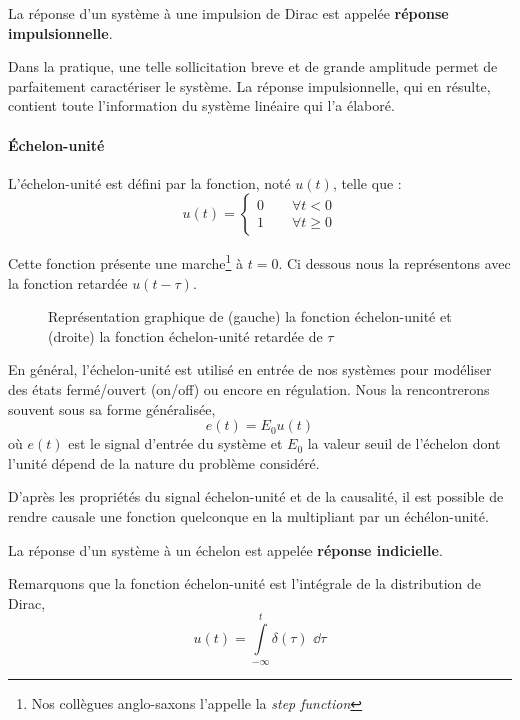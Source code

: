 La réponse d'un système à une impulsion de Dirac est appelée \textbf{réponse impulsionnelle}.

Dans la pratique, une telle sollicitation breve et de grande amplitude
permet de parfaitement caractériser le système. La réponse impulsionnelle, qui en résulte, contient
toute l'information du système linéaire qui l'a élaboré.

\paragraph{\'Echelon-unité}

L'échelon-unité est défini par la fonction, noté $u(t)$, telle que :
$$
u(t)=
\begin{cases} 
0 \qquad \forall t<0    \\ 
1 \qquad \forall t\geq 0 
\end{cases}
$$

Cette fonction présente une marche\footnote{Nos 
collègues anglo-saxons l'appelle la \og\emph{step function}\fg} à $t=0$. 
Ci dessous nous la représentons avec la fonction retardée $u(t-\tau)$.
\begin{figure}[!h]
\begin{center}

\end{center}
    \caption{Représentation graphique de (gauche) la fonction échelon-unité et (droite) la fonction 
    échelon-unité retardée de $\tau$\label{fig-echelon}}
\end{figure}

En général, l'échelon-unité est utilisé en entrée de nos systèmes pour 
modéliser des états fermé/ouvert (\og on/off\fg) ou encore en régulation.
Nous la rencontrerons souvent sous sa forme généralisée, 
$$
e(t)=E_0u(t)
$$
où $e(t)$ est le signal d'entrée du système et $E_0$ la valeur seuil de l'échelon dont 
l'unité dépend de la nature du problème considéré.

D'après les propriétés du signal échelon-unité et de la causalité, il est possible 
de rendre causale une fonction quelconque en la multipliant par un échélon-unité.

La réponse d'un système à un échelon est appelée \textbf{réponse indicielle}.

Remarquons que la fonction échelon-unité est l'intégrale de la distribution de Dirac,
$$
u(t)=\int\limits_{-\infty}^{t} \delta(\tau)\,\,\dd{\tau}
$$

